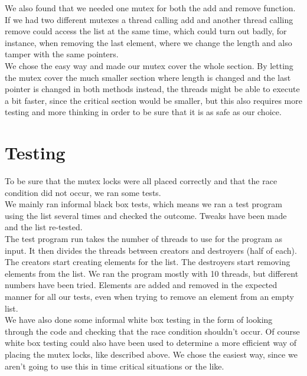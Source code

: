 We also found that we needed one mutex for both the add and remove function. If we had two different mutexes a thread calling add and another thread calling remove could access the list at the same time, which could turn out badly, for instance, when removing the last element, where we change the length and also tamper with the same pointers.\\

We chose the easy way and made our mutex cover the whole section. By letting the mutex cover the much smaller section where length is changed and the last pointer is changed in both methods instead, the threads might be able to execute a bit faster, since the critical section would be smaller, but this also requires more testing and more thinking in order to be sure that it is as safe as our choice.\\

\section{Testing}
To be sure that the mutex locks were all placed correctly and that the race condition did not occur, we ran some tests.\\

We mainly ran informal black box tests, which means we ran a test program using the list several times and checked the outcome. Tweaks have been made and the list re-tested.\\

The test program run takes the number of threads to use for the program as input. It then divides the threads between creators and destroyers (half of each). The creators start creating elements for the list. The destroyers start removing elements from the list. We ran the program mostly with 10 threads, but different numbers have been tried. Elements are added and removed in the expected manner for all our tests, even when trying to remove an element from an empty list.\\

We have also done some informal white box testing in the form of looking through the code and checking that the race condition shouldn't occur. Of course white box testing could also have been used to determine a more efficient way of placing the mutex locks, like described above. We chose the easiest way, since we aren't going to use this in time critical situations or the like.\\